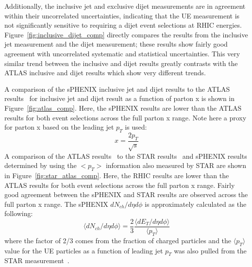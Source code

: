 Additionally, the inclusive jet and exclusive dijet measurements are in agreement within their uncorrelated uncertainties, indicating that the UE measurement is not significantly sensitive to requiring a dijet event selections at RHIC energies.
Figure~\ref{fig:inclusive_dijet_comp} directly compares the results from the inclusive jet measurement and the dijet measurement; these results show fairly good agreement with uncorrelated systematic and statistical uncertainties. 
This very similar trend between the inclusive and dijet results greatly contrasts with the ATLAS inclusive and dijet results which show very different trends. 

A comparison of the sPHENIX inclusive jet and dijet results to the ATLAS results~\cite{ATLAS:2014underlying_event_jets_7tev} for inclusive jet and dijet result as a function of parton x is shown in Figure~\ref{fig:atlas_comp}. Here, the sPHENIX results are lower than the ATLAS results for both event selections across the full parton x range.
Note here a proxy for parton x based on the leading jet $p_{T}$ is used: 
\begin{equation}
    x = \frac{2p_{T}}{\sqrt{s}}
\end{equation}
A comparison of the ATLAS results~\cite{ATLAS:2014underlying_event_jets_7tev} to the STAR results~\cite{STAR:2024underlying_event_pp_200gev} and sPHENIX results determined by using the $<p_{T}>$ information also measured by STAR are shown in Figure~\ref{fig:star_atlas_comp}. Here, the RHIC results are lower than the ATLAS results for both event selections across the full parton x range. Fairly good agreement between the sPHENIX and STAR results are observed across the full parton x range. The sPHENIX $dN_{ch}/d\eta d\phi$ is approximately calculated as the following:
\begin{equation}
    \langle dN_{ch}/d\eta d\phi \rangle = \frac{2}{3}\frac{\langle dE_{T}/d\eta d\phi \rangle}{\langle p_{T} \rangle}
\end{equation}
where the factor of 2/3 comes from the fraction of charged particles and the $\langle p_{T} \rangle$ value for the UE particles as a function of leading jet $p_{T}$ was also pulled from the STAR measurement~\cite{STAR:2024underlying_event_pp_200gev}.

